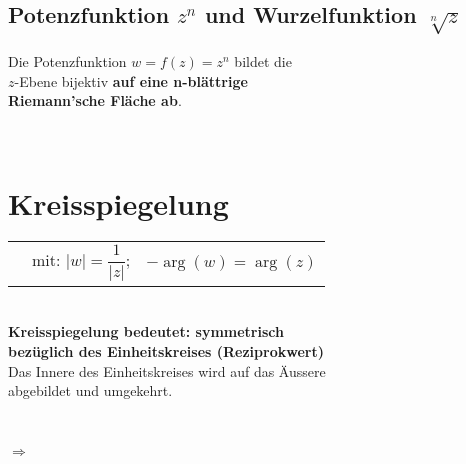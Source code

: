 	\subsection{Potenzfunktion $z^n$ und Wurzelfunktion $\sqrt[n]{z}$}
		\begin{minipage}[t]{0.5\textwidth}
			\begin{framed}
				Die Potenzfunktion $w = f\left( z \right) = z^n$ bildet die\\[3pt]
				$z$-Ebene bijektiv \textbf{auf eine n-blättrige\\[3pt] Riemann'sche Fläche ab}.
			\end{framed}
		\end{minipage}
		\begin{minipage}[t]{0.5\textwidth}
			
		\end{minipage}\\[3pt]
	
\section{Kreisspiegelung}
	\begin{minipage}[]{0.5\textwidth}
		\begin{tabular}{lll}
			\fbox{$w = \overline{f}\left( z \right) = \dfrac{1}{\overline{z}}$} &
			mit: $|w| = \dfrac{1}{\left| z \right|}$; &
			$-\operatorname{arg}\left( w \right) = \operatorname{arg}\left( z \right)$\\[3pt]
		\end{tabular}\\[3pt]
		\textbf{Kreisspiegelung bedeutet: symmetrisch}\\[3pt]
		\textbf{bezüglich des Einheitskreises (Reziprokwert)}\\[3pt]
		Das Innere des Einheitskreises wird auf das Äussere\\[3pt]
		abgebildet und umgekehrt.
	\end{minipage}
	\begin{minipage}[]{0.5\textwidth}
		\scalebox{0.5}{}
	\end{minipage}\\[3pt]
	\begin{minipage}[t]{0.05\textwidth}
		\vspace{17pt}
		$\Rightarrow$ 
	\end{minipage}

